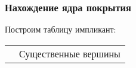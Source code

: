 \documentclass[12pt,a4paper]{report}
\begin{document}
\subsubsection*{Нахождение ядра покрытия}
Построим таблицу импликант:\\
\hfill\break
\begin{tabular}{|c|c|c|c|c|c|c|c|c|c|c|c|c|c|}
    \hline
    \multicolumn{2}{|c|}{}                                    & \multicolumn{12}{|c|}{Существенные вершины}                                                                                                                                                                                                                                                                                                                                                                                                                                                                                                                                                                                                                                                                                                                                                                                                                                                                                                                                                                            \\ \cline{3-14} 

\end{tabular}
\end{document}
